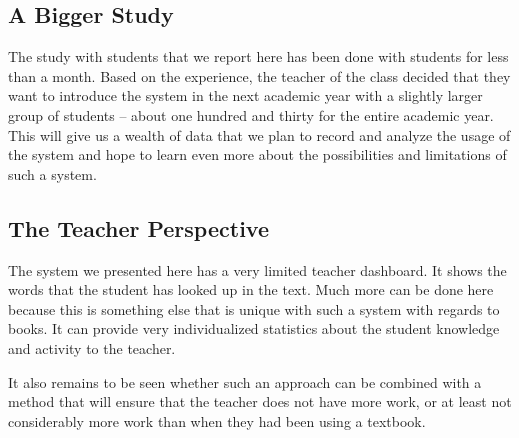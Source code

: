 \subsection{A Bigger Study}
The study with students that we report here has been done with \stcnt students for less than a month. Based on the experience, the teacher of the class decided that they want to introduce the system in the next academic year with a slightly larger group of students -- about one hundred and thirty for the entire academic year. This will give us a wealth of data that we plan to record and analyze the usage of the system and hope to learn even more about the possibilities and limitations of such a system. 

\subsection{The Teacher Perspective}
The system we presented here has a very limited teacher dashboard. It shows the words that the student has looked up in the text. Much more can be done here because this is something else that is unique with such a system with regards to books. It can provide very individualized statistics about the student knowledge and activity to the teacher. 

It also remains to be seen whether such an approach can be combined with a method that will ensure that the teacher does not have more work, or at least not considerably more work than when they had been using a textbook. 

